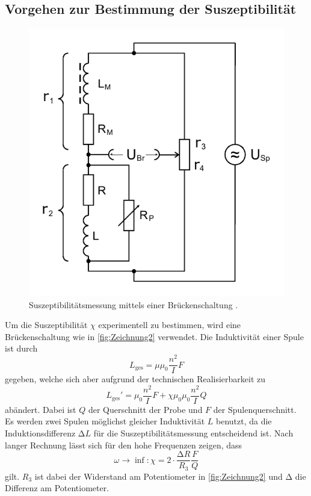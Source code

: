 \subsection{Vorgehen zur Bestimmung der Suszeptibilität}
\begin{figure}
    \center
    \includegraphics[width=\linewidth]{pictures/Zeichnung2.pdf}
    \caption{Suszeptibilitätsmessung mittels einer Brückenschaltung \cite{v606}.}
    \label{fig:Zeichnung2}
\end{figure}
Um die Suszeptibilität $\chi$ experimentell zu bestimmen, wird eine Brückenschaltung wie in \autoref{fig:Zeichnung2} verwendet.
Die Induktivität einer Spule ist durch
\begin{equation}
    L_\text{ges} = \mu \mu_0 \frac{n^2}{I} F
\end{equation}
gegeben, welche sich aber aufgrund der technischen Realisierbarkeit zu
\begin{equation}
    L_\text{ges} ' = \mu_0 \frac{n^2}{I} F + \chi \mu_0 \mu_0 \frac{n^2}{I} Q
\end{equation}
abändert. Dabei ist $Q$ der Querschnitt der Probe und $F$ der Spulenquerschnitt.
Es werden zwei Spulen möglichst gleicher Induktivität $L$ benutzt, da die Induktionsdifferenz $\increment L$ für die Suszeptibilitätsmessung entscheidend ist.
Nach langer Rechnung lässt sich für den hohe Frequenzen zeigen, dass
\begin{equation}
    \omega \rightarrow \inf: \chi = 2 \cdot \frac{\increment R}{R_3} \frac{F}{Q}
\end{equation}
gilt.
$R_3$ ist dabei der Widerstand am Potentiometer in \autoref{fig:Zeichnung2} und $\increment$ die Differenz am Potentiometer.